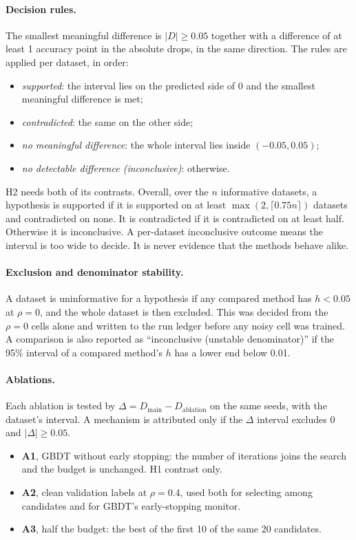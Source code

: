 \documentclass[11pt]{article}
\begin{document}
\paragraph{Decision rules.} The smallest meaningful difference is $|D| \ge 0.05$ together
with a difference of at least 1 accuracy point in the absolute drops, in the same direction.
The rules are applied per dataset, in order:
\begin{itemize}
  \item \emph{supported}: the interval lies on the predicted side of 0 and the smallest
    meaningful difference is met;
  \item \emph{contradicted}: the same on the other side;
  \item \emph{no meaningful difference}: the whole interval lies inside $(-0.05, 0.05)$;
  \item \emph{no detectable difference (inconclusive)}: otherwise.
\end{itemize}
H2 needs both of its contrasts. Overall, over the $n$ informative datasets, a hypothesis is
supported if it is supported on at least $\max(2, \lceil 0.75 n\rceil)$ datasets and
contradicted on none. It is contradicted if it is contradicted on at least half. Otherwise
it is inconclusive. A per-dataset inconclusive outcome means the interval is too wide to
decide. It is never evidence that the methods behave alike.

\paragraph{Exclusion and denominator stability.} A dataset is uninformative for a
hypothesis if any compared method has $h < 0.05$ at $\rho=0$, and the whole dataset is then
excluded. This was decided from the $\rho=0$ cells alone and written to the run ledger
before any noisy cell was trained. A comparison is also reported as ``inconclusive
(unstable denominator)'' if the 95\% interval of a compared method's $h$ has a lower end
below 0.01.

\paragraph{Ablations.} Each ablation is tested by $\Delta = D_{\mathrm{main}} -
D_{\mathrm{ablation}}$ on the same seeds, with the dataset's interval. A mechanism is
attributed only if the $\Delta$ interval excludes 0 and $|\Delta| \ge 0.05$.
\begin{itemize}
  \item \textbf{A1}, GBDT without early stopping: the number of iterations joins the search
  and the budget is unchanged. H1 contrast only.
  \item \textbf{A2}, clean validation labels at $\rho=0.4$, used both for selecting among
  candidates and for GBDT's early-stopping monitor.
  \item \textbf{A3}, half the budget: the best of the first 10 of the same 20 candidates.
\end{itemize}
\end{document}
